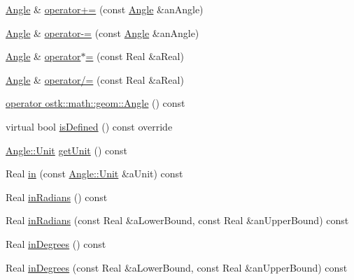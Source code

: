 \begin{DoxyCompactItemize}
\item 
\hyperlink{classostk_1_1physics_1_1units_1_1_angle}{Angle} \& \hyperlink{classostk_1_1physics_1_1units_1_1_angle_a814933d09dc8cb6cb4a7a013386c2267}{operator+=} (const \hyperlink{classostk_1_1physics_1_1units_1_1_angle}{Angle} \&an\+Angle)
\item 
\hyperlink{classostk_1_1physics_1_1units_1_1_angle}{Angle} \& \hyperlink{classostk_1_1physics_1_1units_1_1_angle_ac7699382075d4997670ed0071f8ba540}{operator-\/=} (const \hyperlink{classostk_1_1physics_1_1units_1_1_angle}{Angle} \&an\+Angle)
\item 
\hyperlink{classostk_1_1physics_1_1units_1_1_angle}{Angle} \& \hyperlink{classostk_1_1physics_1_1units_1_1_angle_aba01c2eb2166f1be5c5ff8d5b2cb6363}{operator$\ast$=} (const Real \&a\+Real)
\item 
\hyperlink{classostk_1_1physics_1_1units_1_1_angle}{Angle} \& \hyperlink{classostk_1_1physics_1_1units_1_1_angle_aaa0ad11b6d769a44c3a5bcef2bad8b6a}{operator/=} (const Real \&a\+Real)
\item 
\hyperlink{classostk_1_1physics_1_1units_1_1_angle_ae92c124ae780a2c61747f343a6b3f773}{operator ostk\+::math\+::geom\+::\+Angle} () const
\item 
virtual bool \hyperlink{classostk_1_1physics_1_1units_1_1_angle_a912562d12513b2fcee56262208206b62}{is\+Defined} () const override
\item 
\hyperlink{classostk_1_1physics_1_1units_1_1_angle_aea1f8018b1d378b9dee56959d8eb9def}{Angle\+::\+Unit} \hyperlink{classostk_1_1physics_1_1units_1_1_angle_abe7e90d80d24d15464a6041569196ea3}{get\+Unit} () const
\item 
Real \hyperlink{classostk_1_1physics_1_1units_1_1_angle_a80e7aa75986fc9b4644b6d0db4f3ba9c}{in} (const \hyperlink{classostk_1_1physics_1_1units_1_1_angle_aea1f8018b1d378b9dee56959d8eb9def}{Angle\+::\+Unit} \&a\+Unit) const
\item 
Real \hyperlink{classostk_1_1physics_1_1units_1_1_angle_a732c6410b7eae97dadec4c9151c86e3b}{in\+Radians} () const
\item 
Real \hyperlink{classostk_1_1physics_1_1units_1_1_angle_acaa7d6b9b7ff74854c194b554cfe94a6}{in\+Radians} (const Real \&a\+Lower\+Bound, const Real \&an\+Upper\+Bound) const
\item 
Real \hyperlink{classostk_1_1physics_1_1units_1_1_angle_ac5faeae2943418bfebdf26a641083662}{in\+Degrees} () const
\item 
Real \hyperlink{classostk_1_1physics_1_1units_1_1_angle_aa1ea48dcf3d6c11fb6317f422604a382}{in\+Degrees} (const Real \&a\+Lower\+Bound, const Real \&an\+Upper\+Bound) const

\end{DoxyCompactItemize}
